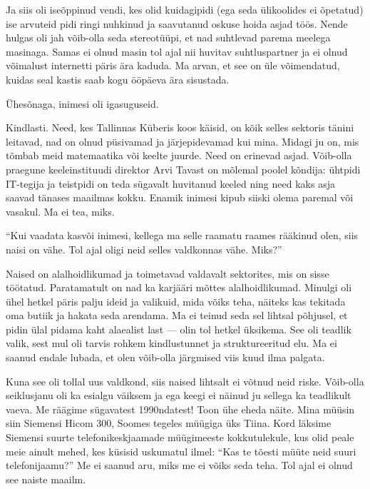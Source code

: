 Ja siis oli iseõppinud vendi, kes olid kuidagipidi (ega seda ülikoolides ei õpetatud) 
ise arvuteid pidi ringi nuhkinud ja saavutanud oskuse hoida asjad töös. 
Nende hulgas oli jah võib-olla seda stereotüüpi, et nad
suhtlevad parema meelega masinaga. Samas ei olnud masin tol ajal nii huvitav 
suhtluspartner ja ei olnud võimalust internetti päris ära kaduda. Ma arvan, et see on üle võimendatud, 
kuidas seal kastis saab kogu ööpäeva ära sisustada. 

Ühesõnaga, inimesi oli igasuguseid.


Kindlasti. Need, kes Tallinnas 
Küberis koos käisid, on kõik selles sektoris tänini leitavad, nad on olnud
püsivamad ja järjepidevamad kui mina. Midagi ju on, mis tõmbab meid
matemaatika või keelte juurde. Need on erinevad 
asjad. Võib-olla praegune 
keeleinstituudi direktor Arvi Tavast on mõlemal poolel 
kõndija: ühtpidi IT-tegija ja teistpidi on teda sügavalt huvitanud 
keeled ning need kaks asja saavad tänases maailmas kokku. Enamik inimesi 
kipub siiski olema paremal või vasakul. Ma ei tea, miks.

\enquote{Kui vaadata kasvõi inimesi, kellega ma selle raamatu raames rääkinud olen, siis 
naisi on vähe. Tol ajal oligi neid selles valdkonnas vähe. Miks?}\label{sisu:tydrukud}

Naised on alalhoidlikumad ja toimetavad valdavalt sektorites, mis on 
sisse töötatud. Paratamatult on nad ka karjääri mõttes 
alalhoidlikumad. Minulgi oli ühel hetkel päris 
palju ideid ja valikuid, mida võiks teha, näiteks kas tekitada oma butiik ja 
hakata seda arendama. Ma ei teinud seda sel lihtsal põhjusel, et pidin ülal pidama kaht alaealist last --- olin tol hetkel üksikema. See oli teadlik valik, sest mul oli tarvis rohkem kindlustunnet ja struktureeritud elu. Ma 
ei saanud endale lubada, et olen võib-olla järgmised viis kuud ilma palgata. 

Kuna see oli tollal uus valdkond, siis naised lihtsalt ei võtnud neid riske. Võib-olla 
seiklusjanu oli ka esialgu väiksem ja ega keegi ei näinud ju 
sellega ka teadlikult vaeva. Me räägime sügavatest 1990ndatest! Toon ühe
eheda näite. Mina müüsin siin Siemensi Hicom 300, Soomes tegeles müügiga üks Tiina. Kord läksime 
Siemensi suurte telefonikeskjaamade müügimeeste kokkutulekule, kus olid peale meie ainult 
mehed, kes küsisid uskumatul ilmel: 
\enquote{Kas te tõesti müüte neid suuri telefonijaamu?} Me ei saanud aru, miks 
me ei võiks seda teha. Tol ajal ei olnud see naiste maailm. 

